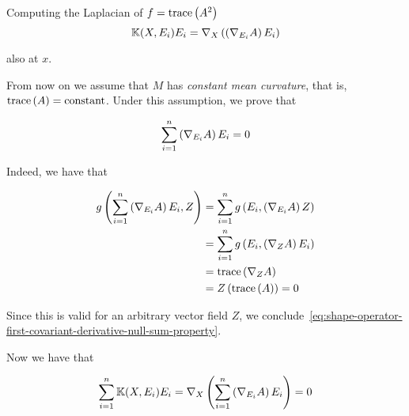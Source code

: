 \begin{frame}[allowframebreaks]{Computing the Laplacian of \(f=\text{trace}\left({A^{2}}\right)\)}
  \begin{equation}\label{eq:shape-operators-second-covariant-derivative-at-x-ei}
    \mathbb{K}(X,E_{i})E_{i}=\nabla_{X}\left(\left(\nabla_{E_{i}}A\right)E_{i}\right)
  \end{equation}

  also at \(x\).

  \framebreak

  From now on we assume that \(M\) has \textit{constant mean curvature}, that
  is, \(\text{trace}\left({A}\right)=\text{constant}\). Under this assumption, we prove that

  \begin{equation}\label{eq:shape-operator-first-covariant-derivative-null-sum-property}
    \sum_{i=1}^{n}\left(\nabla_{E_{i}}A\right)E_{i}=0
  \end{equation}

  \framebreak

  Indeed, we have that

  \begin{align*}
    g\left(\sum_{i=1}^{n}\left(\nabla_{E_{i}}A\right)E_{i},Z\right) & =\sum_{i=1}^{n}g\left(E_{i},\left(\nabla_{E_{i}}A\right)Z\right) \\
                                                                            & =\sum_{i=1}^{n}g\left(E_{i},\left(\nabla_{Z}A\right)E_{i}\right) \\
                                                                            & =\text{trace}\left({\nabla_{Z}A}\right)                                             \\
                                                                            & =Z\left(\text{trace}\left({A}\right)\right) = 0
  \end{align*}

  Since this is valid for an arbitrary vector field \(Z\), we
  conclude~\eqref{eq:shape-operator-first-covariant-derivative-null-sum-property}.

  \framebreak

  Now we have that

  \begin{equation}\label{eq:shape-operator-second-covariant-derivative-null-sum-property}
    \sum_{i=1}^{n}\mathbb{K}(X,E_{i})E_{i}
    =\nabla_{X}\left(\sum_{i=1}^{n}\left(\nabla_{E_{i}}A\right)E_{i}\right)=0
  \end{equation}
  

\end{frame}
